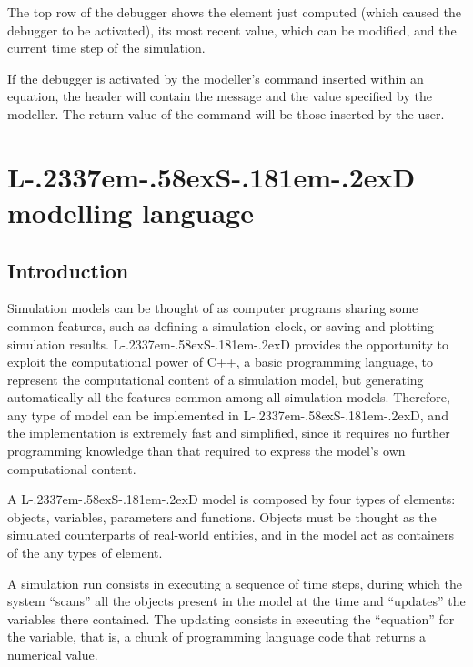\documentclass [11pt,a4paper] {book}
\def\LsD{{L\kern-.2337em\lower-.58ex\hbox{S}\kern-.181em\lower-.2ex\hbox{D}}\xspace}
\begin{document}
The top row of the debugger shows the element just computed (which caused the debugger to be activated), its most recent value, which can be modified, and the current time step of the simulation. 

If the debugger is activated by the modeller's command  inserted within an equation, the header will contain the message and the value specified by the modeller. The return value of the command will be those inserted by the user.



















\section{\LsD modelling language }\label{sec:lan}

\subsection{Introduction}

Simulation models can be thought of as computer programs sharing some common features, such as defining a simulation clock, or saving and plotting simulation results. \LsD provides the opportunity to exploit the computational power of C++, a basic programming language, to represent the computational content of a simulation model, but generating automatically all the features common among all simulation models. Therefore, any type of model can be implemented in \LsD, and the implementation is extremely fast and simplified, since it requires no further programming knowledge than that required to express the model's own computational content. 

A \LsD model is composed by four types of elements: objects, variables, parameters and functions. Objects must be thought as the simulated counterparts of real-world entities, and in the model act as containers of the any types of element. 

A simulation run consists in executing a sequence of time steps, during which the system ``scans'' all the objects present in the model at the time and ``updates'' the variables there contained. The updating consists in executing the ``equation'' for the variable, that is, a chunk of programming language code that returns a numerical value.
\end{document}
